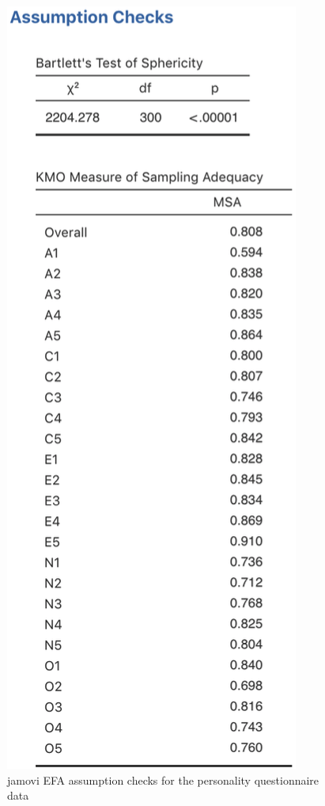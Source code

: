 \documentclass[
]{book}
\begin{document}
\begin{figure}
\includegraphics[width=1\linewidth]{img/factoranalysis/fa4} \caption{jamovi EFA assumption checks for the personality questionnaire data}\label{fig:fa4}
\end{figure}
\end{document}
